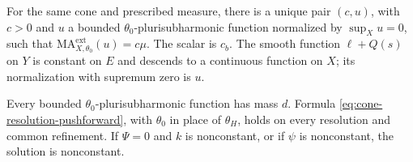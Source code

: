 \begin{theorem}\label{thm:cone-bounded-equation}
For the same cone and prescribed measure, there is a unique pair $(c,u)$, with $c>0$ and $u$ a bounded $\theta_0$-plurisubharmonic function normalized by $\sup_Xu=0$, such that $\mathrm{MA}^{\mathrm{ext}}_{X,\theta_0}(u)=c\mu$. The scalar is $c_b$. The smooth function $\ell+Q(s)$ on $Y$ is constant on $E$ and descends to a continuous function on $X$; its normalization with supremum zero is $u$.

Every bounded $\theta_0$-plurisubharmonic function has mass $d$. Formula \eqref{eq:cone-resolution-pushforward}, with $\theta_0$ in place of $\theta_H$, holds on every resolution and common refinement. If $\Psi=0$ and $k$ is nonconstant, or if $\psi$ is nonconstant, the solution is nonconstant.
\end{theorem}

